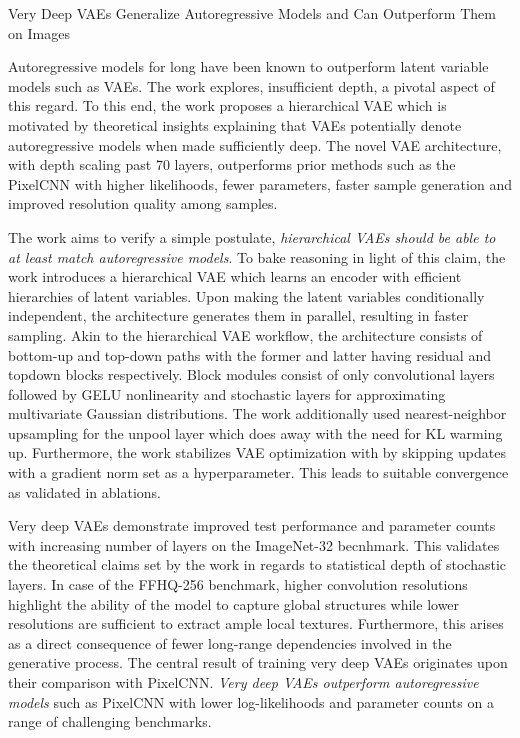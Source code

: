 \documentclass[11pt,letterpaper]{article}
\begin{document}
\begin{center}
  \large{Very Deep VAEs Generalize Autoregressive Models and Can Outperform Them on Images}
\end{center}

Autoregressive models for long have been known to outperform latent variable models such as VAEs. The work explores, insufficient depth, a pivotal aspect of this regard. To this end, the work proposes a hierarchical VAE which is motivated by theoretical insights explaining that VAEs potentially denote autoregressive models when made sufficiently deep. The novel VAE architecture, with depth scaling past 70 layers, outperforms prior methods such as the PixelCNN with higher likelihoods, fewer parameters, faster sample generation and improved resolution quality among samples. 

The work aims to verify a simple postulate, \textit{hierarchical VAEs should be able to at least match autoregressive models}. To bake reasoning in light of this claim, the work introduces a hierarchical VAE which learns an encoder with efficient hierarchies of latent variables. Upon making the latent variables conditionally independent, the architecture generates them in parallel, resulting in faster sampling. Akin to the hierarchical VAE workflow, the architecture consists of bottom-up and top-down paths with the former and latter having residual and topdown blocks respectively. Block modules consist of only convolutional layers followed by GELU nonlinearity and stochastic layers for approximating multivariate Gaussian distributions. The work additionally used nearest-neighbor upsampling for the unpool layer which does away with the need for KL warming up. Furthermore, the work stabilizes VAE optimization with by skipping updates with a gradient norm set as a hyperparameter. This leads to suitable convergence as validated in ablations. 

Very deep VAEs demonstrate improved test performance and parameter counts with increasing number of layers on the ImageNet-32 becnhmark. This validates the theoretical claims set by the work in regards to statistical depth of stochastic layers. In case of the FFHQ-256 benchmark, higher convolution resolutions highlight the ability of the model to capture global structures while lower resolutions are sufficient to extract ample local textures. Furthermore, this arises as a direct consequence of fewer long-range dependencies involved in the generative process. The central result of training very deep VAEs originates upon their comparison with PixelCNN. \textit{Very deep VAEs outperform autoregressive models} such as PixelCNN with lower log-likelihoods and parameter counts on a range of challenging benchmarks. 
\end{document}
